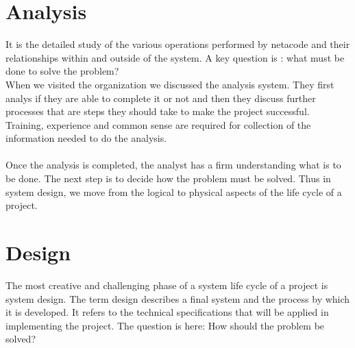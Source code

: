 \documentclass[a4paper,12pt]{report}
\begin{document}
\section{Analysis}
 It is the detailed study of the various operations performed by netacode  and their relationships within and outside of the system. A key question is : what must be done to solve the problem?\\ 
 
 When we visited the organization we discussed the analysis system. They first analys if they are able to complete it or not and then they discuss further processes that are steps they should take to make the project successful. Training, experience and common sense are required for collection of the information needed to do the analysis.
 \\ \\
 Once the analysis is completed, the analyst has a firm understanding what is to be done. The next step is to decide how the problem must be solved. Thus in system design, we move from the logical to physical aspects of the life cycle of a project.\\
 \section{Design}
 The most creative and challenging phase of a system life cycle of a project is system design. The term design describes a final system and the process by which it is developed. It refers to the technical specifications that will be applied in implementing the project. The question is here: How should the problem be solved?\\
 
\end{document}
